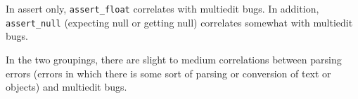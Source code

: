 In assert only, \lstinline{assert_float} correlates with multiedit bugs. In addition, \lstinline{assert_null} (expecting null or getting null) correlates somewhat with multiedit bugs.

In the two groupings, there are slight to medium correlations between parsing errors (errors in which there is some sort of parsing or conversion of text or objects) and multiedit bugs.

